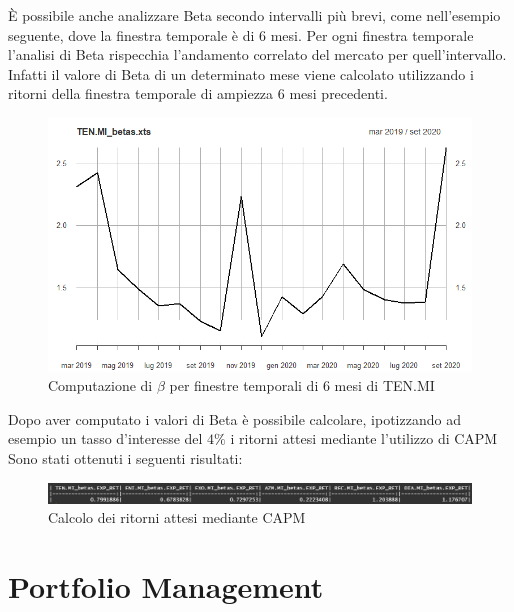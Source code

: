 \documentclass[12pt]{article}
\begin{document}
È possibile anche analizzare Beta secondo intervalli più brevi, come nell'esempio seguente, dove la finestra temporale è di 6 mesi. Per ogni finestra temporale l'analisi di Beta rispecchia l'andamento correlato del mercato per quell'intervallo. Infatti il valore di Beta di un determinato mese viene calcolato utilizzando i ritorni della finestra temporale di ampiezza 6 mesi precedenti.
\begin{figure}[!htb]
    \centering
    \includegraphics[width=1\textwidth]{immagini/betaTenMIfinestratotale.png}
    \caption{Computazione di $\beta$ per finestre temporali di 6 mesi di TEN.MI}
\end{figure}
\FloatBarrier
Dopo aver computato i valori di Beta è possibile calcolare, ipotizzando ad esempio un tasso d'interesse del $4\%$ i ritorni attesi mediante l'utilizzo di CAPM
Sono stati ottenuti i seguenti risultati:
\begin{figure}[!htb]
    \centering
    \includegraphics[width=1\textwidth]{immagini/capm.png}
    \caption{Calcolo dei ritorni attesi mediante CAPM}
\end{figure}
\FloatBarrier

\newpage
\section{Portfolio Management}
\end{document}
